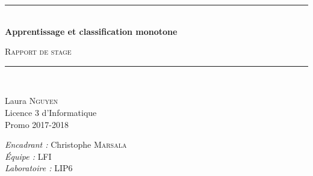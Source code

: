 \documentclass[a4paper]{article}
\newcommand{\HRule}{\rule{\linewidth}{0.5mm}}
\begin{document}

\begin{titlepage}
  \begin{center}


    \HRule \\[0.4cm]
    { \huge \bfseries Apprentissage et classification monotone\\[0.4cm] }

      \textsc{\LARGE Rapport de stage}\\[0.4cm]

    \HRule \\[0.4cm]

    \begin{minipage}{0.4\textwidth}
      \begin{flushleft} \large
        Laura \textsc{Nguyen}\\
        Licence 3 d'Informatique\\
        Promo 2017-2018 \\
      \end{flushleft}
    \end{minipage}
    \begin{minipage}{0.5\textwidth}
      \begin{flushright} \large
        \emph{Encadrant :} Christophe \textsc{Marsala}\\
        \emph{Équipe : } \textsc{LFI} \\
        \emph{Laboratoire : } \textsc{LIP6} \\


\end{flushright}
\end{minipage}
\end{center}
\end{titlepage}
\end{document}
